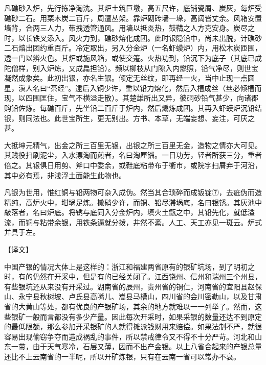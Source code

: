 \documentclass[12pt,UTF8]{ctexbook}
\begin{document}
凡礁砂入炉，先行拣净淘洗。其炉土筑巨墩，高五尺许，底铺瓷屑、炭灰，每炉受礁砂二石。用栗木炭二百斤，周遭丛架。靠炉砌砖墙一垛，高阔皆丈余。风箱安置墙背，合两三人力，带拽透管通风。用墙以抵炎热，鼓鞲之人方克安身。炭尽之时，以长铁叉添入。风火力到，礁砂熔化成团。此时银隐铅中，尚未出脱，计礁砂二石熔出团约重百斤。冷定取出，另入分金炉（一名虾蟆炉）内，用松木炭匝围，透一门以辨火色。其炉或施风箱，或使交箑。火热功到，铅沉下为底子（其底已成陀僧样，别入炉炼，又成扁担铅）。频以柳枝从门隙入内燃照，铅气净尽，则世宝凝然成象矣。此初出银，亦名生银。倾定无丝纹，即再经一火，当中止现一点圆星，滇人名曰“茶经”。逮后入铜少许，重以铅力熔化，然后入槽成丝（丝必倾槽而现，以四围匡住，宝气不横溢走散）。其楚雄所出又异，彼硐砂铅气甚少，向诸郡购铅佐炼。每礁百斤，先坐铅二百斤于炉内，然后煽炼成团。其再入虾蟆炉沉铅结银，则同法也。此世宝所生，更无别出。方书、本草，无端妄想、妄注，可厌之甚。

大抵坤元精气，出金之所三百里无银，出银之所三百里无金，造物之情亦大可见。其贱役扫刷泥尘，入水漂淘而煎者，名曰淘厘锱。一日功劳，轻者所获三分，重者倍之。其银俱日用剪、斧口中委余，或鞋底粘带布于衢市，或院宇扫屑弃于河沿，其中必有焉，非浅浮土面能生此物也。

凡银为世用，惟红铜与铅两物可杂入成伪。然当其合琐碎而成钣锭⑦，去疵伪而造精纯，高炉火中，坩埚足炼。撒硝少许，而铜、铅尽滞埚底，名曰银锈。其灰池中敲落者，名曰炉底。将锈与底同入分金炉内，填火土甑之中，其铅先化，就低溢流，而铜与粘带余银，用铁条逼就分拨，井然不紊。人工、天工亦见一斑云。炉式并具于左。

【译文】

中国产银的情况大体上是这样的：浙江和福建两省原有的银矿坑场，到了明初之时，有的仍然在开采中，但是有的已经关闭了。江西饶州、信州和瑞州三个州县，有些银坑还从来没有开采过。湖南省的辰州，贵州省的铜仁，河南省的宜阳县赵保山、永宁县秋树坡、卢氏县高嘴儿、嵩县马槽山，四川省的会川密勒山，以及甘肃省的大黄山等处，都有优良的产银矿场，其余的地方就难以一一列举了。然而，这些银矿一般而言都没有多少产量。因此每次开采时，如果采银的数量还达不到原定的最低限额，那么参加开采银矿的人就得摊派钱财用来赔偿。如果法制不严，就很容易出现偷窃争夺而造成祸乱的事件，所以禁戒律令又不得不十分严苛。河北和山东一带，由于天气寒冷，石层又薄，因而不出产金银。以上八省合起来的产银总量还比不上云南省的一半呢，所以开矿炼银，只有在云南一省可以常办不衰。
\end{document}
